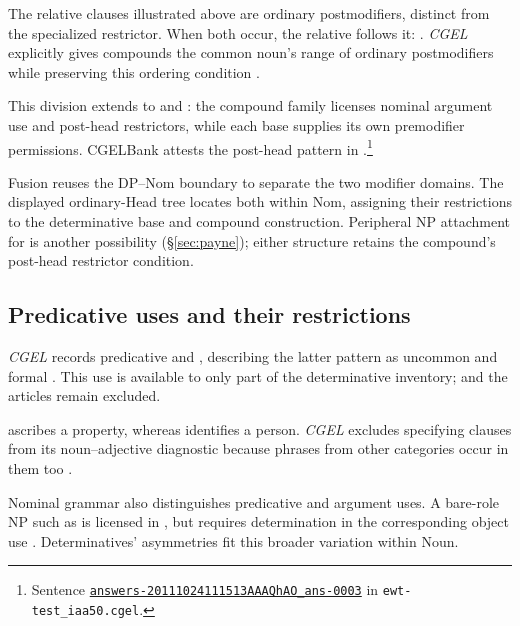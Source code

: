 \documentclass[12pt]{article}
\begin{document}
The relative clauses illustrated above are ordinary postmodifiers, distinct from the specialized restrictor. When both occur, the relative follows it: . \textit{CGEL} explicitly gives compounds the common noun's range of ordinary postmodifiers while preserving this ordering condition \citep[423]{huddleston2002}.

This division extends to  and : the compound family licenses nominal argument use and post-head restrictors, while each base supplies its own premodifier permissions. CGELBank attests the post-head pattern in .\footnote{Sentence \href{https://github.com/nert-nlp/cgel/blob/d0a2c2d8c522b23d5aa879fc9cb94948f4285b2c/datasets/ewt-test_iaa50.cgel\#L179-L181}{\nolinkurl{answers-20111024111513AAAQhAO_ans-0003}} in \nolinkurl{ewt-test_iaa50.cgel}.}

Fusion reuses the DP--Nom boundary to separate the two modifier domains. The displayed ordinary-Head tree locates both within Nom, assigning their restrictions to the determinative base and compound construction. Peripheral NP attachment for  is another possibility (§\ref{sec:payne}); either structure retains the compound's post-head restrictor condition.

\subsection{Predicative uses and their restrictions}\label{sec:predication}

\textit{CGEL} records predicative  and , describing the latter pattern as uncommon and formal \citep[392, 395--396]{huddleston2002}. This use is available to only part of the determinative inventory;  and the articles remain excluded.

 ascribes a property, whereas  identifies a person. \textit{CGEL} excludes specifying  clauses from its noun--adjective diagnostic because phrases from other categories occur in them too \citep[536]{huddleston2002}.

Nominal grammar also distinguishes predicative and argument uses. A bare-role NP such as  is licensed in , but requires determination in the corresponding object use  \citep[328]{huddleston2002}. Determinatives' asymmetries fit this broader variation within Noun.
\end{document}
